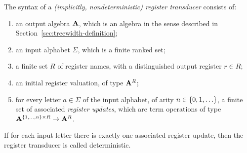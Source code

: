 \begin{definition} \label{def:register-transducer}  The syntax of a  \emph{(implicitly, nondeterministic) register transducer} consists of:
    \begin{enumerate}
        \item an output algebra $\mathbf{A}$, which is an algebra in the sense described in Section~\ref{sec:treewidth-definition};
        \item an input alphabet $\Sigma$, which is a finite ranked set;
        \item a finite set $R$ of register names, with a distinguished output register $r \in R$;
        \item an initial register valuation, of type $\mathbf{A}^R$;
        \item for every letter $a \in \Sigma$ of the input alphabet, of arity $n \in \{0,1,\ldots\}$, a finite set of  associated \emph{register updates}, which are  term operations of type  $\mathbf{A}^{\{1,\ldots,n\} \times R} \to \mathbf{A}^R$. 
    \end{enumerate}
    If for each input letter there is exactly one associated register update, then the register transducer is called deterministic. 
\end{definition}

